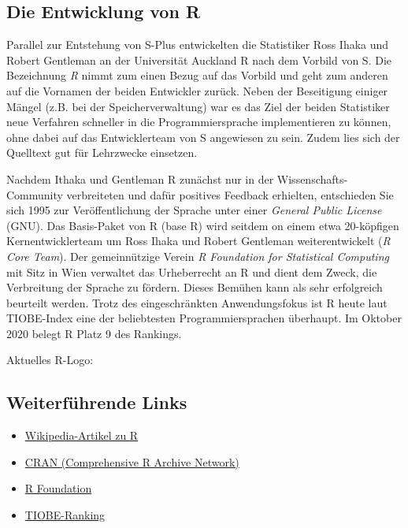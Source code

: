 \documentclass[
]{book}
\providecommand{\tightlist}{%
  \setlength{\itemsep}{0pt}\setlength{\parskip}{0pt}}
\begin{document}
\hypertarget{die-entwicklung-von-r}{%
\subsection{Die Entwicklung von R}\label{die-entwicklung-von-r}}

Parallel zur Entstehung von S-Plus entwickelten die Statistiker Ross Ihaka und Robert Gentleman
an der Universität Auckland R nach dem Vorbild von S. Die Bezeichnung \emph{R} nimmt zum einen Bezug auf das Vorbild und geht zum anderen auf die Vornamen der beiden Entwickler zurück.
Neben der Beseitigung einiger Mängel (z.B. bei der Speicherverwaltung) war es das Ziel der beiden Statistiker neue Verfahren schneller in die Programmiersprache implementieren zu können, ohne dabei auf das Entwicklerteam von S angewiesen zu sein.
Zudem lies sich der Quelltext gut für Lehrzwecke einsetzen.

Nachdem Ithaka und Gentleman R zunächst nur in der Wissenschafts-Community verbreiteten und dafür
positives Feedback erhielten, entschieden Sie sich 1995 zur Veröffentlichung der Sprache unter einer
\emph{General Public License} (GNU).
Das Basis-Paket von R (base R) wird seitdem on einem etwa 20-köpfigen Kernentwicklerteam um Ross Ihaka und Robert
Gentleman weiterentwickelt (\emph{R Core Team}).
Der gemeinnützige Verein \emph{R Foundation for Statistical Computing} mit Sitz in Wien verwaltet das Urheberrecht an R
und dient dem Zweck, die Verbreitung der Sprache zu fördern.
Dieses Bemühen kann als sehr erfolgreich beurteilt werden.
Trotz des eingeschränkten Anwendungsfokus ist R heute laut TIOBE-Index eine der beliebtesten Programmiersprachen überhaupt. Im Oktober 2020 belegt R Platz 9 des Rankings.

Aktuelles R-Logo:

\hypertarget{weiterfuxfchrende-links}{%
\subsection*{Weiterführende Links}\label{weiterfuxfchrende-links}}

\begin{itemize}
\tightlist
\item
  \href{https://de.wikipedia.org/wiki/R_(Programmiersprache)}{Wikipedia-Artikel zu R}
\item
  \href{https://cran.r-project.org/}{CRAN (Comprehensive R Archive Network)}
\item
  \href{https://www.r-project.org/foundation/}{R Foundation}
\item
  \href{https://www.tiobe.com/tiobe-index/}{TIOBE-Ranking}
\end{itemize}
\end{document}
